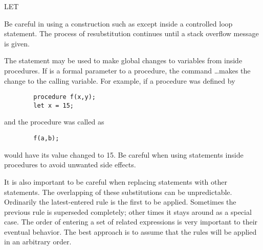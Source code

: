 \begin{Command}{LET}
\begin{Comments}
Be careful in using a construction such as  except inside
a controlled loop statement.  The process of resubstitution continues until 
a stack overflow message is given.  

The  statement may be used to make global changes to variables from
inside procedures.  If  is a formal parameter to a procedure, the 
command \ldots makes the change to the calling variable.  
For example, if a procedure was defined by 
\begin{verbatim}
        procedure f(x,y);
        let x = 15;
\end{verbatim}
and the procedure was called as
\begin{verbatim}
        f(a,b);
\end{verbatim}
 would have its value changed to 15.  Be careful when using 
statements inside procedures to avoid unwanted side effects.

It is also important to be careful when replacing  statements with
other  statements.  The overlapping of these substitutions can be
unpredictable.  Ordinarily the latest-entered rule is the first to be applied.
Sometimes the previous rule is superseded completely; other times it stays
around as a special case.  The order of entering a set of related 
expressions is very important to their eventual behavior.  The best
approach is to assume that the rules will be applied in an arbitrary order.
\end{Comments}
\end{Command}


